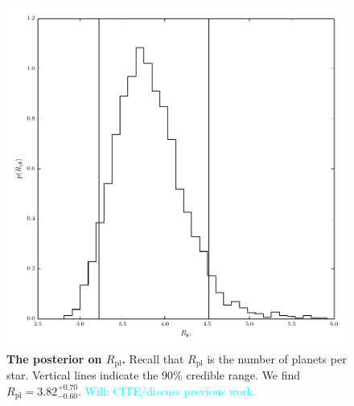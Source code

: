 \documentclass{nature}
\newcommand{\Rpl}{R_\mathrm{pl}}
\newcommand{\Will}[1]{\textcolor{cyan}{Will: #1}}
\begin{document}
\begin{figure}
  \includegraphics[width=\columnwidth]{npl}
  \caption{\label{fig:npl} \textbf{The posterior on $\Rpl$.}  Recall
    that $\Rpl$ is the number of planets per star.  Vertical lines
    indicate the 90\% credible range.  We find $\Rpl =
    3.82_{-0.60}^{+0.70}$. \Will{CITE/discuss previous work.}}
\end{figure}
\end{document}
